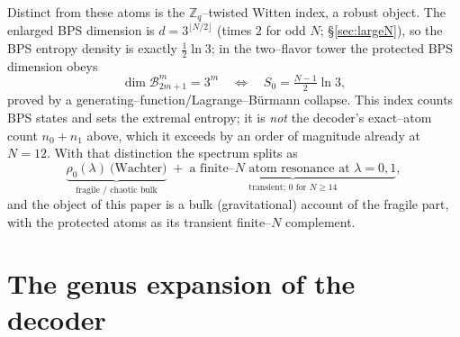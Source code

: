 \documentclass[11pt]{article}
\begin{document}
Distinct from these atoms is the $\mathbb Z_q$--twisted Witten index, a robust object. The enlarged BPS
dimension is $d=3^{\lfloor N/2\rfloor}$ (times $2$ for odd $N$; \S\ref{sec:largeN}), so the BPS entropy
density is exactly $\tfrac12\ln3$; in the two--flavor tower the protected BPS dimension obeys
\begin{equation}
  \dim\mathcal B^m_{2m+1}=3^m
  \quad\Longleftrightarrow\quad
  S_0=\tfrac{N-1}{2}\ln 3 ,
  \label{eq:index}
\end{equation}
proved by a generating--function/Lagrange--B\"urmann collapse. This index counts BPS states and sets the
extremal entropy; it is \emph{not} the decoder's exact--atom count $n_0+n_1$ above, which it exceeds by
an order of magnitude already at $N=12$. With that distinction the spectrum splits as
\begin{equation}
  \underbrace{\rho_0(\lambda)\ \text{(Wachter)}}_{\text{fragile / chaotic bulk}}
  \;+\;
  \underbrace{\text{a finite--}N\text{ atom resonance at }\lambda=0,1}_{\text{transient; }0\text{ for }N\ge14} ,
  \label{eq:split}
\end{equation}
and the object of this paper is a bulk (gravitational) account of the fragile part, with the protected
atoms as its transient finite--$N$ complement.

\FloatBarrier
\section{The genus expansion of the decoder}
\label{sec:genus}
\end{document}
